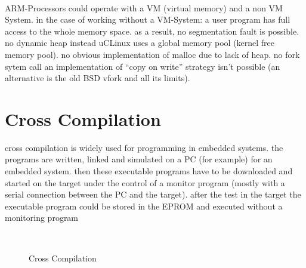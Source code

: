 \begin{description}
\os{\newpage}
\item[{\rot\bf Restrictions when using non VM-systems}]~\\[-3ex]
\bigskip
\bi
	\ite ARM-Processors could operate with a VM (virtual memory) and a non VM System.
	\ite in the case of working without a VM-System:
	\bi
		\ite a user program has full access to the whole memory space.
		\ite as a result, no segmentation fault is possible.
		\ite no dynamic heap \pr instead uCLinux uses a global memory pool (kernel free memory pool).
		\ite no obvious implementation of malloc due to lack of heap.
		\ite no fork sytem call \pr an implementation of ``copy on write'' strategy isn't possible (an alternative is the old BSD vfork and all its limits).
	\ei
\ei
\end{description}

\section{Cross Compilation}
\bi
	\ite cross compilation is widely used for programming in embedded systems.
	\ite the programs are written, linked and simulated on a PC (for example) for an embedded system.
	\ite then these executable programs have to be downloaded and started on the target under the control of a monitor program (mostly with a serial connection between the PC and the target).
	\ite after the test in the target the executable program could be stored in the EPROM and executed without a monitoring program
\ei
\os{\newpage}
\begin{figure}[!hbtp]
     \begin{center}
	  \\
	  \caption{Cross Compilation}
     \end{center}
\end{figure}

